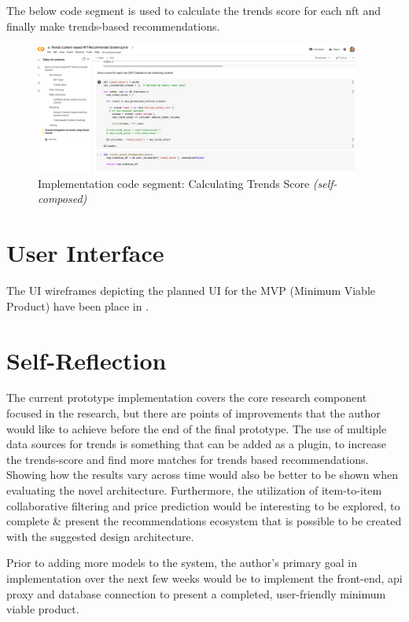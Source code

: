 The below code segment is used to calculate the trends score for each \gls{nft} and finally make trends-based recommendations.
\begin{figure}[h!]
\centering
\includegraphics[width=0.95\textwidth]{images/Implementation/code/calculating trends score.png}
\caption{Implementation code segment: Calculating Trends Score \textit{(self-composed)}}
\label{fig:code-trends-score}
\end{figure}


\section{User Interface}

The UI wireframes depicting the planned UI for the MVP (Minimum Viable Product) have been place in \textbf{}.

\section{Self-Reflection}
The current prototype implementation covers the core research component focused in the research, but there are points of improvements that the author would like to achieve before the end of the final prototype. The use of multiple data sources for trends is something that can be added as a plugin, to increase the trends-score and find more matches for trends based recommendations. Showing how the results vary across time would also be better to be shown when evaluating the novel architecture. Furthermore, the utilization of item-to-item collaborative filtering and price prediction would be interesting to be explored, to complete \& present the recommendations ecosystem that is possible to be created with the suggested design architecture.

Prior to adding more models to the system, the author's primary goal in implementation over the next few weeks would be to implement the front-end, \gls{api} proxy and database connection to present a completed, user-friendly minimum viable product.


